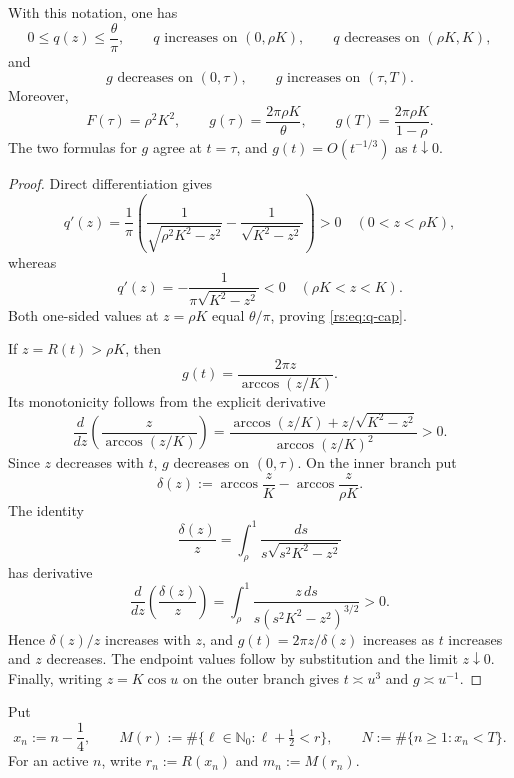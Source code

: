\begin{lemma}
\label{rs:lem:shape}
With this notation, one has
\begin{equation}
 0\leq q(z)\leq\frac{\theta}{\pi},
 \qquad
 q\text{ increases on }(0,\rho K),
 \qquad q\text{ decreases on }(\rho K,K),
 \label{rs:eq:q-cap}
\end{equation}
and
\begin{equation}
 g\text{ decreases on }(0,\tau),
 \qquad g\text{ increases on }(\tau,T).
 \label{rs:eq:g-shape}
\end{equation}
Moreover,
\begin{equation}
 F(\tau)=\rho^2K^2,
 \qquad
 g(\tau)=\frac{2\pi\rho K}{\theta},
 \qquad
 g(T)=\frac{2\pi\rho K}{1-\rho}.
 \label{rs:eq:g-data}
\end{equation}
The two formulas for $g$ agree at $t=\tau$, and
$g(t)=O(t^{-1/3})$ as $t\downarrow0$.
\end{lemma}

\begin{proof}
Direct differentiation gives
\[
 q'(z)=\frac1\pi\left(
 \frac1{\sqrt{\rho^2K^2-z^2}}-
 \frac1{\sqrt{K^2-z^2}}\right)>0
 \quad(0<z<\rho K),
\]
whereas
\[
 q'(z)=-\frac1{\pi\sqrt{K^2-z^2}}<0
 \quad(\rho K<z<K).
\]
Both one-sided values at $z=\rho K$ equal $\theta/\pi$, proving
\eqref{rs:eq:q-cap}.

If $z=R(t)>\rho K$, then
\[
 g(t)=\frac{2\pi z}{\arccos(z/K)}.
\]
Its monotonicity follows from the explicit derivative
\[
 \frac{d}{dz}\left(\frac{z}{\arccos(z/K)}\right)
 =\frac{\arccos(z/K)+z/\sqrt{K^2-z^2}}
        {\arccos(z/K)^2}>0.
\]
Since $z$ decreases with $t$, $g$ decreases on $(0,\tau)$.  On the inner
branch put
\[
 \delta(z):=\arccos\frac zK-\arccos\frac z{\rho K}.
\]
The identity
\[
\frac{\delta(z)}z
 =\int_\rho^1\frac{ds}{s\sqrt{s^2K^2-z^2}}
\]
has derivative
\[
 \frac{d}{dz}\left(\frac{\delta(z)}z\right)
 =\int_\rho^1
 \frac{z\,ds}{s(s^2K^2-z^2)^{3/2}}>0.
\]
Hence $\delta(z)/z$ increases with $z$, and
$g(t)=2\pi z/\delta(z)$ increases as $t$ increases and $z$ decreases.
The endpoint values follow by substitution and the limit $z\downarrow0$.
Finally, writing $z=K\cos u$ on the outer branch gives
$t\asymp u^3$ and $g\asymp u^{-1}$.
\end{proof}

Put
\begin{equation}
 x_n:=n-\frac14,
 \qquad
 M(r):=\#\{\ell\in\mathbb N_0:\ell+\tfrac12<r\},
 \qquad
 N:=\#\{n\geq1:x_n<T\}.
 \label{rs:eq:grids}
\end{equation}
For an active $n$, write $r_n:=R(x_n)$ and $m_n:=M(r_n)$.

